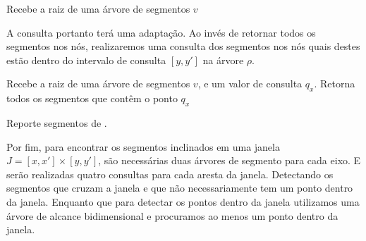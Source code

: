 \begin{algorithm}[h!]
    \caption{Recebe a raiz de uma árvore de segmentos $v$}
    \begin{algorithmic}[1]
                \State {}
            \EndIf
                \State {}
            \EndIf
                \State {}
            \EndIf
            
        \EndFunction
    \end{algorithmic}
\end{algorithm}

A consulta portanto terá uma adaptação. Ao invés de retornar todos os segmentos nos nós, realizaremos uma consulta dos segmentos nos nós quais destes estão dentro do intervalo de consulta $[y, y']$ na árvore $\rho$.

\begin{algorithm}[h!]
    \caption{Recebe a raiz de uma árvore de segmentos $v$, e um valor de consulta $q_x$. Retorna todos os segmentos que contêm o ponto $q_x$}
    \begin{algorithmic}[1]
            \State Reporte segmentos de .
                    \State {}
                \Else
                    \State {}
                \EndIf
            \EndIf
        \EndFunction
    \end{algorithmic}
\end{algorithm}

Por fim, para encontrar os segmentos inclinados em uma janela $J = [x, x'] \times [y, y']$, são necessárias duas árvores de segmento para cada eixo. E serão realizadas quatro consultas para cada aresta da janela. Detectando os segmentos que cruzam a janela e que não necessariamente tem um ponto dentro da janela. Enquanto que para detectar os pontos dentro da janela utilizamos uma árvore de alcance bidimensional e procuramos ao menos um ponto dentro da janela. 

